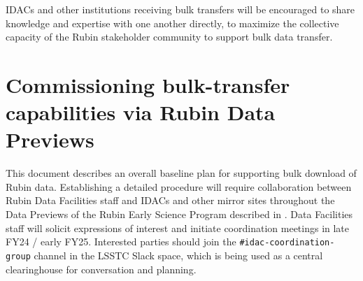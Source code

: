 IDACs and other institutions receiving bulk transfers will be encouraged to share knowledge and expertise with one another directly, to maximize the collective capacity of the Rubin stakeholder community to support bulk data transfer.

\section{Commissioning bulk-transfer capabilities via Rubin Data Previews}

This document describes an overall baseline plan for supporting bulk download of Rubin data. Establishing a detailed procedure will require collaboration between Rubin Data Facilities staff and IDACs and other mirror sites throughout the Data Previews of the Rubin Early Science Program described in . Data Facilities staff will solicit expressions of interest and initiate coordination meetings in late FY24 / early FY25. Interested parties should join the \texttt{\#idac-coordination-group} channel in the LSSTC Slack space, which is being used as a central clearinghouse for conversation and planning.


